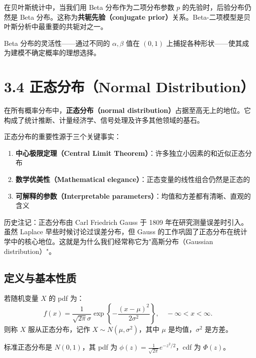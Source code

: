 \begin{example}\label{rmk:beta-conjugate-ch3}
在贝叶斯统计中，当我们用 Beta 分布作为二项分布参数 $p$ 的先验时，后验分布仍然是 Beta 分布。这称为\textbf{共轭先验（conjugate prior）}关系。Beta-二项模型是贝叶斯分析中最重要的共轭对之一。
\end{example}

Beta 分布的灵活性——通过不同的 $\alpha, \beta$ 值在 $(0,1)$ 上捕捉各种形状——使其成为建模不确定概率的理想选择。

\section{3.4 正态分布（Normal Distribution）}\label{sec:normal-distribution-ch3}

在所有概率分布中，\textbf{正态分布（normal distribution）}占据至高无上的地位。它构成了统计推断、计量经济学、信号处理及许多其他领域的基石。

正态分布的重要性源于三个关键事实：
\begin{enumerate}
\item \textbf{中心极限定理（Central Limit Theorem）}：许多独立小因素的和近似正态分布
\item \textbf{数学优美性（Mathematical elegance）}：正态变量的线性组合仍然是正态的
\item \textbf{可解释的参数（Interpretable parameters）}：均值和方差都有清晰、直观的含义
\end{enumerate}

历史注记：正态分布由 Carl Friedrich Gauss 于 1809 年在研究测量误差时引入。虽然 Laplace 早些时候讨论过误差分布，但 Gauss 的工作巩固了正态分布在统计学中的核心地位。这就是为什么我们经常称它为"高斯分布（Gaussian distribution）"。

\subsection{定义与基本性质}\label{sub:normal-definition-ch3}

\begin{definition}[正态分布]\label{def:normal-distribution-ch3}
若随机变量 $X$ 的 pdf 为：
\[
f(x) = \frac{1}{\sqrt{2\pi}\sigma} \exp\left\{ -\frac{(x-\mu)^{2}}{2\sigma^{2}} \right\}, \quad -\infty < x < \infty.
\label{eq:normal-pdf-ch3}
\]
则称 $X$ 服从正态分布，记作 $X \sim N(\mu, \sigma^{2})$，其中 $\mu$ 是均值，$\sigma^{2}$ 是方差。
\end{definition}

标准正态分布是 $N(0,1)$，其 pdf 为 $\phi(z) = \frac{1}{\sqrt{2\pi}} e^{-z^{2}/2}$，cdf 为 $\Phi(z)$。

